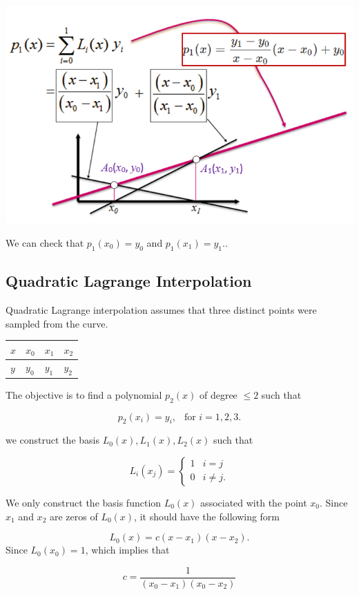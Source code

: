 \documentclass[
]{book}
\begin{document}
\begin{center}\includegraphics[width=0.5\linewidth]{img05/w05-degreeOneLagrangeInterpolation} \end{center}

We can check that \(p_1(x_0) = y_0\) and \(p_1(x_1) = y_1.\).

\hfill\break

\hypertarget{quadratic-lagrange-interpolation}{%
\subsection{Quadratic Lagrange Interpolation}\label{quadratic-lagrange-interpolation}}

Quadratic Lagrange interpolation assumes that three distinct points were sampled from the curve.

\begin{longtable}[]{@{}llll@{}}
\toprule\noalign{}
\(x\) & \(x_0\) & \(x_1\) & \(x_2\) \\
\midrule\noalign{}
\endhead
\bottomrule\noalign{}
\endlastfoot
\(y\) & \(y_0\) & \(y_1\) & \(y_2\) \\
\end{longtable}

The objective is to find a polynomial \(p_2(x)\) of degree \(\le 2\) such that

\[
p_2(x_i) = y_i, \ \ \text{ for } i = 1, 2, 3.
\]

we construct the basis \(L_0(x), L_1(x), L_2(x)\) such that

\[
L_i(x_j) = \begin{cases} 
      1 & i = j \\
      0 & i \ne j. 
   \end{cases}
\]

We only construct the basis function \(L_0(x)\) associated with the point \(x_0\). Since \(x_1\) and \(x_2\) are zeros of \(L_0(x)\), it should have the following form

\[
L_0(x) = c(x-x_1)(x-x_2).
\]
Since \(L_0(x_0) = 1\), which implies that

\[
c = \frac{1}{(x_0-x_1)(x_0-x_2)}
\]
\end{document}
